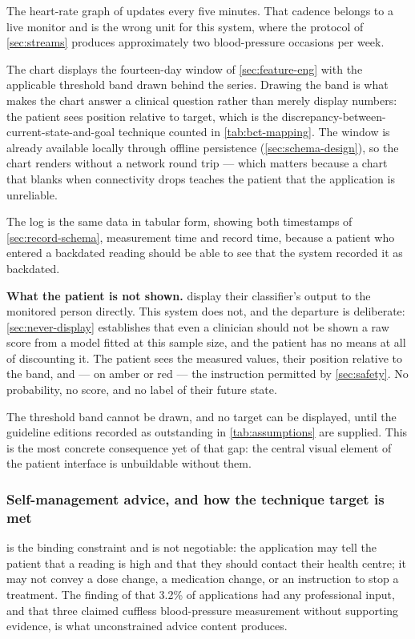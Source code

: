 \documentclass[12pt,a4paper,oneside]{report}
\begin{document}
The heart-rate graph of \textcite{efendi2025} updates every five minutes. That cadence belongs to a live monitor and is the wrong unit for this system, where the protocol of \cref{sec:streams} produces approximately two blood-pressure occasions per week.

The chart displays the fourteen-day window of \cref{sec:feature-eng} with the applicable threshold band drawn behind the series. Drawing the band is what makes the chart answer a clinical question rather than merely display numbers: the patient sees position relative to target, which is the discrepancy-between-current-state-and-goal technique counted in \cref{tab:bct-mapping}. The window is already available locally through offline persistence (\cref{sec:schema-design}), so the chart renders without a network round trip --- which matters because a chart that blanks when connectivity drops teaches the patient that the application is unreliable.

The log is the same data in tabular form, showing both timestamps of \cref{sec:record-schema}, measurement time and record time, because a patient who entered a backdated reading should be able to see that the system recorded it as backdated.

\textbf{What the patient is not shown.} \Textcite{efendi2025} display their classifier's output to the monitored person directly. This system does not, and the departure is deliberate: \cref{sec:never-display} establishes that even a clinician should not be shown a raw score from a model fitted at this sample size, and the patient has no means at all of discounting it. The patient sees the measured values, their position relative to the band, and --- on amber or red --- the instruction permitted by \cref{sec:safety}. No probability, no score, and no label of their future state.

The threshold band cannot be drawn, and no target can be displayed, until the guideline editions recorded as outstanding in \cref{tab:assumptions} are supplied. This is the most concrete consequence yet of that gap: the central visual element of the patient interface is unbuildable without them.

\subsubsection{Self-management advice, and how the technique target is met}\label{sec:bct-mapping}

 is the binding constraint and is not negotiable: the application may tell the patient that a reading is high and that they should contact their health centre; it may not convey a dose change, a medication change, or an instruction to stop a treatment. The finding of \textcite{alessa2019} that 3.2\% of applications had any professional input, and that three claimed cuffless blood-pressure measurement without supporting evidence, is what unconstrained advice content produces.
\end{document}
